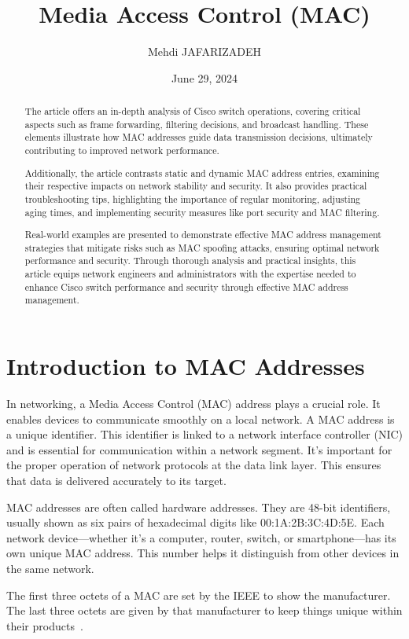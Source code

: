\documentclass[11pt,a4paper]{article}
\title{Media Access Control (MAC)}
\author{Mehdi JAFARIZADEH}
\date{June 29, 2024}
\begin{document}
\maketitle

\begin{abstract}
    The article offers an in-depth analysis of Cisco switch operations, covering critical aspects such as frame forwarding, filtering decisions, and broadcast handling. These elements illustrate how MAC addresses guide data transmission decisions, ultimately contributing to improved network performance.

    Additionally, the article contrasts static and dynamic MAC address entries, examining their respective impacts on network stability and security. It also provides practical troubleshooting tips, highlighting the importance of regular monitoring, adjusting aging times, and implementing security measures like port security and MAC filtering.

    Real-world examples are presented to demonstrate effective MAC address management strategies that mitigate risks such as MAC spoofing attacks, ensuring optimal network performance and security. Through thorough analysis and practical insights, this article equips network engineers and administrators with the expertise needed to enhance Cisco switch performance and security through effective MAC address management.
\end{abstract}


\section*{Introduction to MAC Addresses}
In networking, a Media Access Control (MAC) address plays a crucial role. It enables devices to communicate smoothly on a local network. A MAC address is a unique identifier. This identifier is linked to a network interface controller (NIC) and is essential for communication within a network segment. It’s important for the proper operation of network protocols at the data link layer. This ensures that data is delivered accurately to its target.

MAC addresses are often called hardware addresses. They are 48-bit identifiers, usually shown as six pairs of hexadecimal digits like 00:1A:2B:3C:4D:5E. Each network device—whether it's a computer, router, switch, or smartphone—has its own unique MAC address. This number helps it distinguish from other devices in the same network.

The first three octets of a MAC are set by the IEEE to show the manufacturer. The last three octets are given by that manufacturer to keep things unique within their products~\cite{IEEE-Registration-Authority}.
\end{document}
